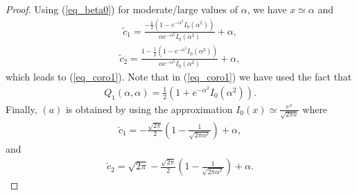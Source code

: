 \begin{proof}
Using (\ref{eq_beta0}) for moderate/large values of $\alpha$, we have $x \simeq \alpha$ and
\begin{align}
        \tilde{c}_1 = \frac{-\frac{1}{2}\left(1-e^{-\alpha^2}I_0(\alpha^2)\right)}{\alpha e^{-\alpha^2}I_0(\alpha^2)}+\alpha,
\end{align}
\begin{align}
     \tilde{c}_2 = \frac{1-\frac{1}{2}\left(1-e^{-\alpha^2}I_0(\alpha^2)\right)}{\alpha e^{-\alpha^2}I_0(\alpha^2)}+\alpha,
\end{align}
which leads to (\ref{eq_coro1}). Note that in (\ref{eq_coro1}) we have used the fact that \cite[Eq.  (A-3-2)]{schwartz1995communication}
\begin{align}
    Q_1(\alpha,\alpha) = \frac{1}{2}\left(1+e^{-\alpha^2}I_0(\alpha^2)\right).
\end{align}
Finally, $(a)$ is obtained by using the approximation $I_0(x) \simeq \frac{e^x}{\sqrt{2\pi x}}$ where
\begin{align}\label{eq_dotc1}
        \breve{c}_1 = -\frac{\sqrt{2\pi}}{2}\left(1-\frac{1}{\sqrt{2\pi\alpha^2}}\right)+\alpha,
\end{align}
and
\begin{align}\label{eq_dotc2}
     \breve{c}_2 = \sqrt{2\pi}-\frac{\sqrt{2\pi}}{2}\left(1-\frac{1}{\sqrt{2\pi\alpha^2}}\right)+\alpha.
\end{align}
\end{proof}

